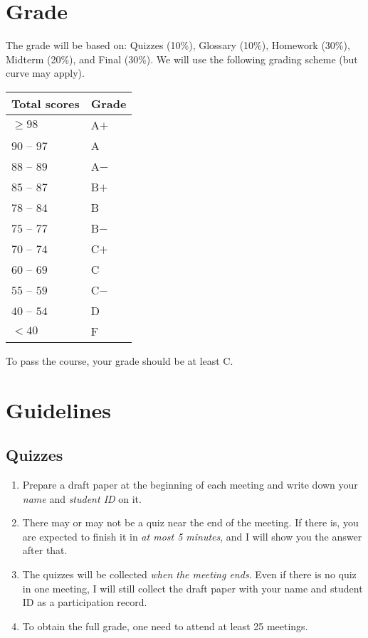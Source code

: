 \documentclass[12pt]{article}
\begin{document}
\section{Grade} 
The grade will be based on: Quizzes (10\%), Glossary
(10\%), Homework (30\%), Midterm (20\%), and Final (30\%). 
We will use the following grading scheme (but curve may apply).
\begin{center}
	\begin{tabular}{||C{0.2\textwidth}|C{0.1\textwidth}||}
		\hline 
		Total scores & Grade \\
		\hline 
		$\geqslant 98$ & A$+$ \\
		$90$ -- $97$ & A \\
		$88$ -- $89$ & A$-$ \\
		\hline 
		$85$ -- $87$ & B$+$ \\
		$78$ -- $84$ & B \\
		$75$ -- $77$ & B$-$ \\
		\hline 
		$70$ -- $74$ & C$+$ \\
		$60$ -- $69$ & C \\
		\hline 
		$55$ -- $59$ & C$-$ \\
		$40$ -- $54$ & D \\
		$< 40$ & F \\
		\hline 
	\end{tabular}
\end{center}

To pass the course, your grade should be at least C.

\section{Guidelines}
\subsection{Quizzes}
\begin{enumerate}
	\item Prepare a draft paper at the beginning of each meeting and write down your \emph{name} and \emph{student ID} on it. 
	\item There may or may not be a quiz near the end of the meeting. If there is, you are expected to finish it in \emph{at most 5 minutes}, and I will show you the answer after that. 
	\item The quizzes will be collected \emph{when the meeting ends}. Even if there is no quiz in one meeting, I will still collect the draft paper with your name and student ID as a participation record. 
	\item To obtain the full grade, one need to attend at least 25 meetings. 
\end{enumerate}
\end{document}
